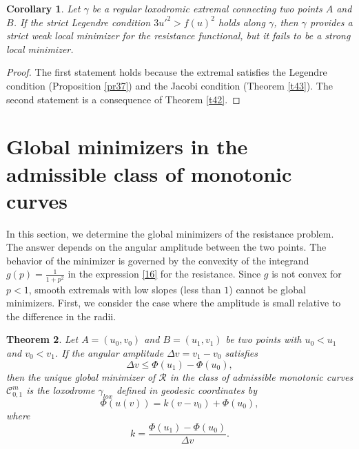 \documentclass[a4paper,12pt]{amsart}
\newtheorem{theorem}{Theorem}[section]
\newtheorem{corollary}[theorem]{Corollary}
\theoremstyle{definition}
\begin{document}
\begin{corollary}\label{co44}
Let $\gamma$ be a regular loxodromic extremal connecting two points $A$ and $B$. If the strict Legendre condition $3u'^2 > f(u)^2$ holds along $\gamma$, then $\gamma$ provides a strict weak local minimizer for the resistance functional, but it fails to be a strong local minimizer.
\end{corollary}

\begin{proof}
The first statement holds because  the extremal satisfies the Legendre condition (Proposition \ref{pr37}) and the Jacobi condition (Theorem \ref{t43}). The second statement is a consequence of Theorem \ref{t42}.
\end{proof}
 
 
 \section{Global minimizers in the admissible class of monotonic curves}\label{s6}
 
 In this section, we determine the global minimizers of the resistance problem. The answer depends on     the angular amplitude between the two points. The   behavior of the minimizer is governed by the convexity of the integrand $g(p) =\frac{1}{1+p^2}$ in the expression \eqref{16} for the resistance.  Since $g$ is not convex for $p < 1$, smooth extremals with low slopes (less than $1$) cannot be global minimizers.  First, we consider the case where the  amplitude is small relative to the difference in the radii.  
  
 \begin{theorem} \label{t61}
 Let  $A=(u_0, v_0)$ and $B=(u_1, v_1)$ be two points with $u_0 < u_1$ and $v_0<v_1$. If the angular amplitude $\Delta v = v_1 - v_0$ satisfies 
\begin{equation}
\Delta v \le \Phi(u_1) - \Phi(u_0),
\end{equation}
then the unique global minimizer of $\mathcal{R}$ in the class of admissible monotonic curves $\mathcal{C}_{0,1}^{m}$ is the loxodrome $\gamma_{lox}$ defined in geodesic coordinates by 
$$\Phi(u(v)) = k(v-v_0)+\Phi(u_0),$$
 where 
$$k = \frac{\Phi(u_1) - \Phi(u_0)}{\Delta v}.$$
\end{theorem}
\end{document}
